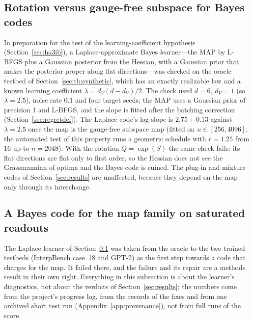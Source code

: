\documentclass[11pt,a4paper]{article}
\newcommand{\dv}{d_V}
\begin{document}
\subsection{Rotation versus gauge-free subspace for Bayes codes}
\label{sec:gauge}

In preparation for the test of the learning-coefficient hypothesis (Section~\ref{sec:ha3ib}), a Laplace-approximate Bayes learner---the MAP by L-BFGS plus a Gaussian posterior from the Hessian, with a Gaussian prior that makes the posterior proper along flat directions---was checked on the oracle testbed of Section~\ref{sec:tb:synthetic}, which has an exactly realizable law and a known learning coefficient $\lambda=\dv(d-\dv)/2$. The check used $d=6$, $\dv=1$ (so $\lambda=2.5$), noise rate 0.1 and four target seeds; the MAP uses a Gaussian prior of precision 1 and L-BFGS, and the slope is fitted after the batching correction (Section~\ref{sec:regretdef}). The Laplace code's log-slope is $2.75\pm0.13$ against $\lambda=2.5$ once the map is the gauge-free subspace map (fitted on $n\in[256,4096]$; the automated test of this property runs a geometric schedule with $r=1.25$ from 16 up to $n=2048$). With the rotation $Q=\exp(S)$ the same check fails: its flat directions are flat only to first order, so the Hessian does not see the Grassmannian of optima and the Bayes code is ruined. The plug-in and mixture codes of Section~\ref{sec:results} are unaffected, because they depend on the map only through its interchange.

\subsection{A Bayes code for the map family on saturated readouts}
\label{sec:bayescode}

The Laplace learner of Section~\ref{sec:gauge} was taken from the oracle to the two trained testbeds (InterpBench case~18 and GPT-2) as the first step towards a code that charges for the map. It failed there, and the failure and its repair are a methods result in their own right. Everything in this subsection is about the learner's diagnostics, not about the verdicts of Section~\ref{sec:results}; the numbers come from the project's progress log, from the records of the fixes and from one archived short test run (Appendix~\ref{app:provenance}), not from full runs of the score.
\end{document}
